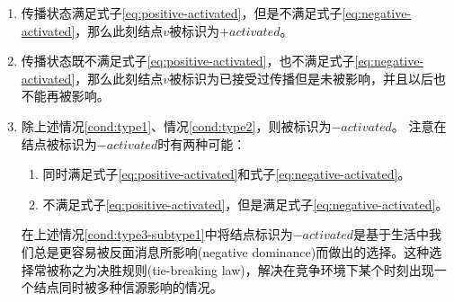 \begin{enumerate}
\item \label{cond:type1} 传播状态满足式子\ref{eq:positive-activated}，但是不满足式子\ref{eq:negative-activated}，那么此刻结点$v$被标识为$+activated$。
\item \label{cond:type2} 传播状态既不满足式子\ref{eq:positive-activated}，也不满足式子\ref{eq:negative-activated}，那么此刻结点$v$被标识为已接受过传播但是未被影响，并且以后也不能再被影响。
\item \label{cond:type3} 除上述情况\ref{cond:type1}、情况\ref{cond:type2}，则被标识为$-activated$。
注意在结点被标识为$-activated$时有两种可能：
\begin{enumerate}
	\item \label{cond:type3-subtype1} 同时满足式子\ref{eq:positive-activated}和式子\ref{eq:negative-activated}。
	\item \label{cond:type3-subtype2} 不满足式子\ref{eq:positive-activated}，但是满足式子\ref{eq:negative-activated}。
\end{enumerate}
在上述情况\ref{cond:type3-subtype1}中将结点标识为$-activated$是基于生活中我们总是更容易被反面消息所影响(negative dominance)而做出的选择。这种选择常被称之为决胜规则(tie-breaking law)，解决在竞争环境下某个时刻出现一个结点同时被多种信源影响的情况。
\end{enumerate}


